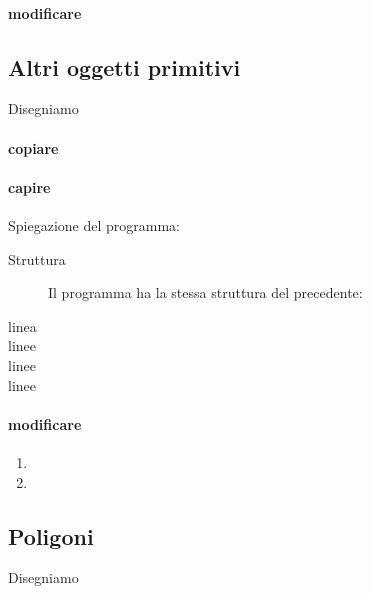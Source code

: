 \begin{osservazione}

\end{osservazione}

\paragraph{modificare}

\subsection{Altri oggetti primitivi}
\label{subsec:geo_int_altrioggetti}
Disegniamo 

\paragraph{copiare}



\paragraph{capire}
Spiegazione del programma:

\begin{description}
 \item [Struttura] 
 Il programma ha la stessa struttura del precedente:
 \item [linea ]
 
 \item [linee ]
 
 \item [linee ]
 \item [linee ]
\end{description}

\begin{osservazione}

\end{osservazione}

\paragraph{modificare}
\begin{enumerate} [noitemsep]
 \item 
 \item 
\end{enumerate}

\subsection{Poligoni}
\label{subsec:geo_int_poligoni}
Disegniamo 

